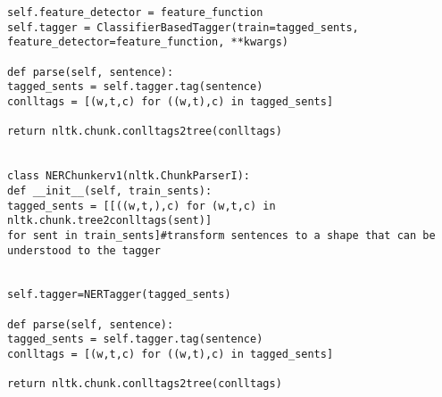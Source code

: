 \documentclass{pre-tfg}
\begin{document}
\begin{lstlisting}[style=consola]
self.feature_detector = feature_function
self.tagger = ClassifierBasedTagger(train=tagged_sents, feature_detector=feature_function, **kwargs)

def parse(self, sentence):
tagged_sents = self.tagger.tag(sentence)
conlltags = [(w,t,c) for ((w,t),c) in tagged_sents]

return nltk.chunk.conlltags2tree(conlltags)


class NERChunkerv1(nltk.ChunkParserI):
def __init__(self, train_sents):
tagged_sents = [[((w,t,),c) for (w,t,c) in                        nltk.chunk.tree2conlltags(sent)]
for sent in train_sents]#transform sentences to a shape that can be understood to the tagger


self.tagger=NERTagger(tagged_sents)

def parse(self, sentence):
tagged_sents = self.tagger.tag(sentence)
conlltags = [(w,t,c) for ((w,t),c) in tagged_sents]

return nltk.chunk.conlltags2tree(conlltags)


\end{lstlisting}

\cleardoublepage
\end{document}
